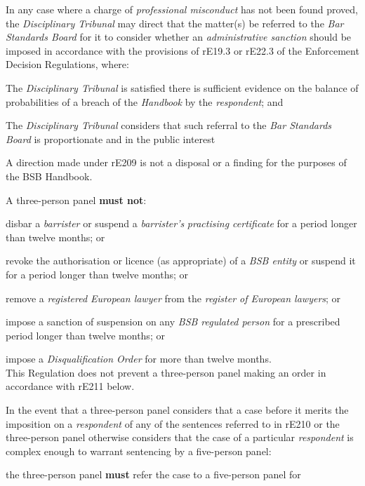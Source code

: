 \par
In any case where a charge of \emph{professional misconduct }has not
been found proved, the \emph{Disciplinary Tribunal }may direct that the
matter(s) be referred to the \emph{Bar Standards Board }for it to
consider whether an \emph{administrative sanction }should be imposed in
accordance with the provisions of rE19.3 or rE22.3 of the Enforcement
Decision Regulations, where:\\\nl \item The \emph{Disciplinary Tribunal }is satisfied there is sufficient
evidence on the balance of probabilities of a breach of
the \emph{Handbook }by the \emph{respondent}; and\item The \emph{Disciplinary Tribunal} considers that such referral to
the \emph{Bar Standards Board} is proportionate and in the public
interest\ln
{}\par
A direction made under rE209 is not a disposal or a finding for the
purposes of the BSB Handbook.\\
\par
A three-person panel  \textcolor{myred}{\textbf{must not}}:\\\nl \item disbar a \emph{barrister} or suspend
a \emph{barrister's} \emph{practising certificate} for a period longer 
than twelve months; or\item revoke the authorisation or licence (as appropriate) of a \emph{BSB
entity} or suspend it for a period longer than twelve months; or\item remove a \emph{registered European lawyer} from the \emph{register of
European lawyers}; or\item impose a sanction of suspension on any \emph{BSB regulated
person} for a prescribed period longer than twelve months; or\item impose a \emph{Disqualification Order }for more than twelve months.\\
This Regulation does not prevent a three-person panel making an order in
accordance with rE211 below.\ln
{}\par
In the event that a three-person panel considers that a case before it
merits the imposition on a \emph{respondent }of any of the sentences
referred to in  rE210 or the three-person panel otherwise considers that
the case of a particular \emph{respondent} is complex enough to warrant
sentencing by a five-person panel:\\\nl \item the three-person panel  \textcolor{myred}{\textbf{must}} refer the case to a five-person panel for
